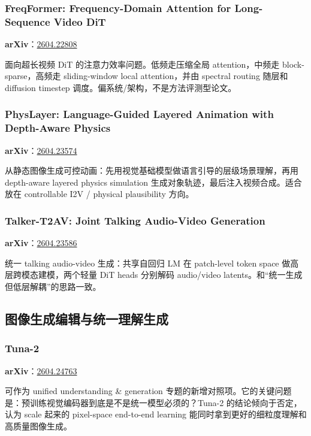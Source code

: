 \subsubsection{FreqFormer: Frequency-Domain Attention for Long-Sequence Video DiT}

\textbf{arXiv}：\href{https://arxiv.org/abs/2604.22808}{2604.22808}

面向超长视频 DiT 的注意力效率问题。低频走压缩全局 attention，中频走 block-sparse，高频走 sliding-window local attention，并由 spectral routing 随层和 diffusion timestep 调度。偏系统/架构，不是方法评测型论文。

\subsubsection{PhysLayer: Language-Guided Layered Animation with Depth-Aware Physics}

\textbf{arXiv}：\href{https://arxiv.org/abs/2604.23574}{2604.23574}

从静态图像生成可控动画：先用视觉基础模型做语言引导的层级场景理解，再用 depth-aware layered physics simulation 生成对象轨迹，最后注入视频合成。适合放在 controllable I2V / physical plausibility 方向。

\subsubsection{Talker-T2AV: Joint Talking Audio-Video Generation}

\textbf{arXiv}：\href{https://arxiv.org/abs/2604.23586}{2604.23586}

统一 talking audio-video 生成：共享自回归 LM 在 patch-level token space 做高层跨模态建模，两个轻量 DiT heads 分别解码 audio/video latents。和“统一生成但低层解耦”的思路一致。

\subsection{图像生成编辑与统一理解生成}

\subsubsection{Tuna-2}

\textbf{arXiv}：\href{https://arxiv.org/abs/2604.24763}{2604.24763}

可作为 unified understanding \& generation 专题的新增对照项。它的关键问题是：预训练视觉编码器到底是不是统一模型必须的？Tuna-2 的结论倾向于否定，认为 scale 起来的 pixel-space end-to-end learning 能同时拿到更好的细粒度理解和高质量图像生成。

